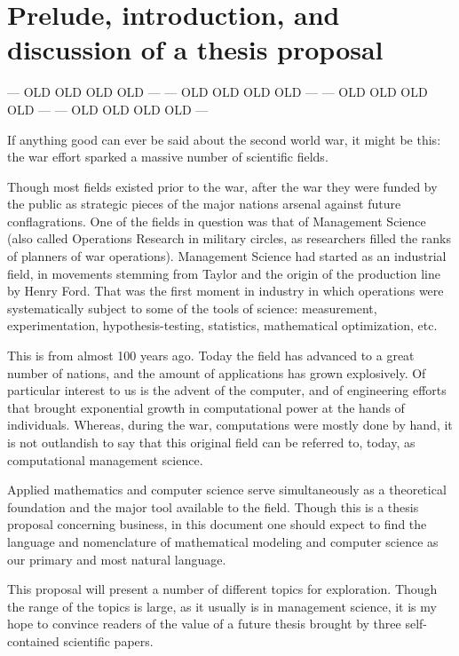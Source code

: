 \chapter*{Prelude, introduction, and discussion of a thesis proposal}
\bigskip

--- OLD OLD OLD OLD ---
--- OLD OLD OLD OLD ---
--- OLD OLD OLD OLD ---
--- OLD OLD OLD OLD ---

\noindent If anything good can ever be said about the second world war, it might be this: the war effort sparked a massive number of scientific fields.

Though most fields existed prior to the war, after the war they were funded by the public as strategic pieces of the major nations arsenal against future conflagrations. One of the fields in question was that of Management Science (also called Operations Research in military circles, as researchers filled the ranks of planners of war operations). Management Science had started as an industrial field, in movements stemming from Taylor and the origin of the production line by Henry Ford.  That was the first moment in industry in which operations were systematically subject to some of the tools of science: measurement, experimentation, hypothesis-testing, statistics, mathematical optimization, etc.

This is from almost 100 years ago. Today the field has advanced to a great number of nations, and the amount of applications has grown explosively.  Of particular interest to us is the advent of the computer, and of engineering efforts that brought exponential growth in computational power at the hands of individuals.  Whereas, during the war, computations were mostly done by hand, it is not outlandish to say that this original field can be referred to, today, as computational management science.

Applied mathematics and computer science serve simultaneously as a theoretical foundation and the major tool available to the field.  Though this is a thesis proposal concerning business, in this document one should expect to find the language and nomenclature of mathematical modeling and computer science as our primary and most natural language.  

This proposal will present a number of different topics for exploration. Though the range of the topics is large, as it usually is in management science, it is my hope to convince readers of the value of a future thesis brought by three self-contained scientific papers. %

